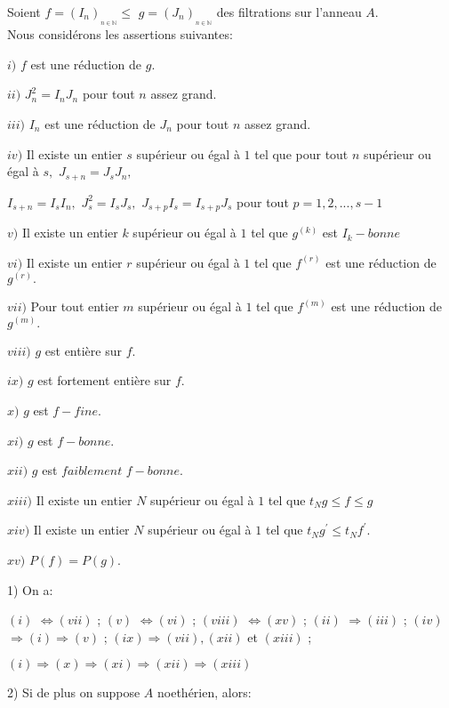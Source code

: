 \begin{montheoreme}
	Soient $f=(I_{n})_{_{n\in \mathbb{N}}}\leq $ $g=(J_{n})_{_{n\in \mathbb{N}}}$ des filtrations sur l'anneau $A.$ \\
	Nous considérons les assertions suivantes:
	
	$i)$ $f$ est une réduction de $g.$
	
	$ii)$ $J_{n}^{2}=I_{n}J_{n}$ pour tout $n$ assez grand.
	
	$iii)$ $I_{n}$ est une réduction de $J_{n}$ pour tout $n$ assez grand.
	
	$iv)$ Il existe un entier $s$ supérieur ou égal à $ 1$ tel que pour tout $n$ supérieur ou égal à $ s,$ $J_{s+n}=J_{s}J_{n},$
	
	$I_{s+n}=I_{s}I_{n},$ $J_{s}^{2}=I_{s}J_{s},$ $J_{s+p}I_{s}=I_{s+p}J_{s}$ pour tout $p=1,2,...,s-1$
	
	$v)$ Il existe un entier $k$ supérieur ou égal à $ 1$ tel que $g^{(k)}$ est $I_{k}-bonne$
	
	$vi)$ Il existe un entier $r$ supérieur ou égal à $ 1$ tel que $f^{(r)}$ est une réduction de $g^{(r)}.$
	
	$vii)$ Pour tout entier $m$ supérieur ou égal à $ 1$ tel que $f^{(m)}$ est une réduction de $g^{(m)}.$
	
	$viii)$ $g$ est entière sur $f.$
	
	$ix)$ $g$ est fortement entière sur $f.$
	
	$x)$ $g$ est $f-fine.$
	
	$xi)$ $g$ est $f-bonne.$
	
	$xii)$ $g$ est $faiblement$ $f-bonne.$
	
	$xiii)$ Il existe un entier $N$ supérieur ou égal à $ 1$ tel que $t_{N}g\leq f\leq g$
	
	$xiv)$ Il existe un entier $N$ supérieur ou égal à $ 1$ tel que $t_{N}g^{\prime }\leq
	t_{N}f^{\prime}$.
	
	$xv)$ $P(f)=P(g)$.
	
	1) On a:
	
	$(i)$ $\Longleftrightarrow (vii)$ ; $(v)$ $\Longleftrightarrow (vi)$ ; $(viii)$ $\Longleftrightarrow (xv)$ ; $(ii)$ $\Longrightarrow (iii)$ ; $(iv)$ 
	$\Longrightarrow (i)\Longrightarrow (v)$ ; $(ix)\Longrightarrow (vii),(xii)$
	et $(xiii)$ ;
	
	$(i)\Longrightarrow (x)\Longrightarrow (xi)\Longrightarrow
	(xii)\Longrightarrow (xiii)$
	
	2) Si de plus on suppose $A$ noethérien, alors:
	

\end{montheoreme}
